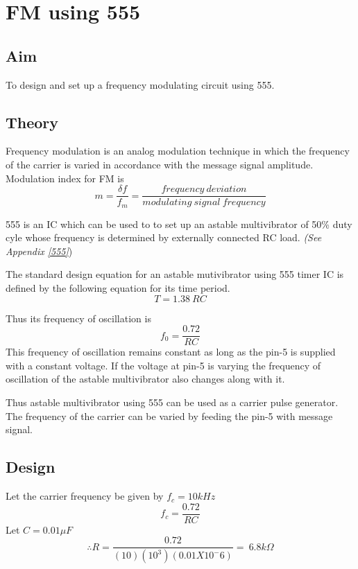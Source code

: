 \chapter[FM using 555]{FM using 555}

\section*{Aim}
To design and set up a frequency modulating circuit using 555.

\section*{Theory}
Frequency modulation is an analog modulation technique in which the frequency of the carrier is varied in accordance with the message signal amplitude.
Modulation index for FM is 
\begin{equation}
m= \frac{\delta f}{f_m}=\frac{frequency \ deviation}{modulating \ signal\  frequency}
\end{equation}

555 is an IC which can be used to to set up an astable multivibrator of 50\% duty cyle whose frequency is determined by externally connected RC load. \emph{(See Appendix \ref{555}})

\noindent The standard design equation for an astable mutivibrator using 555 timer IC is defined by the following equation for its time period.
\begin{equation}
T=1.38 \ RC
\end{equation}

\noindent Thus its frequency of oscillation is 
\begin{equation}
f_0 = \frac{0.72}{RC}
\end{equation}
This frequency of oscillation remains constant as long as the pin-5 is supplied with a constant voltage. If the voltage at pin-5 is varying the frequency of oscillation of the astable multivibrator also changes along with it.

Thus astable multivibrator using 555 can be used as a carrier pulse generator. The frequency of the carrier can be varied by feeding the pin-5 with message signal.
\section*{Design}
\noindent Let the carrier frequency be given by $f_c= 10 kHz$
\begin{equation}
f_c=\frac{0.72}{RC}
\end{equation}
\noindent Let $C=0.01 \mu F$
\begin{equation}
\therefore
R=\frac{0.72}{(10) (10^3)(0.01 X 10^-6)}= \ 6.8 k\Omega
\end{equation}

